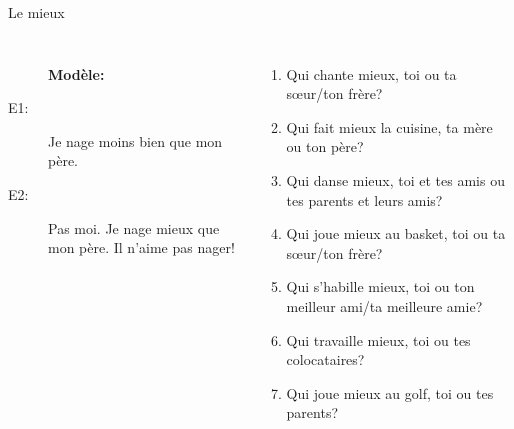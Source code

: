 \begin{frame}{Le mieux}
  \begin{columns}
    \scriptsize
      \begin{description}
        \item[] \textbf{Modèle:}
        \item[] 
        \item[E1:] Je nage moins bien que mon père.
        \item[E2:] Pas moi. Je nage mieux que mon père. Il n'aime pas nager!
      \end{description}
      \begin{enumerate}
        \item Qui chante mieux, toi ou ta sœur/ton frère?
        \item Qui fait mieux la cuisine, ta mère ou ton père?
        \item Qui danse mieux, toi et tes amis ou tes parents et leurs amis?
        \item Qui joue mieux au basket, toi ou ta sœur/ton frère?
        \item Qui s'habille mieux, toi ou ton meilleur ami/ta meilleure amie?
        \item Qui travaille mieux, toi ou tes colocataires?
        \item Qui joue mieux au golf, toi ou tes parents?
      \end{enumerate}
  \end{columns}
\end{frame}